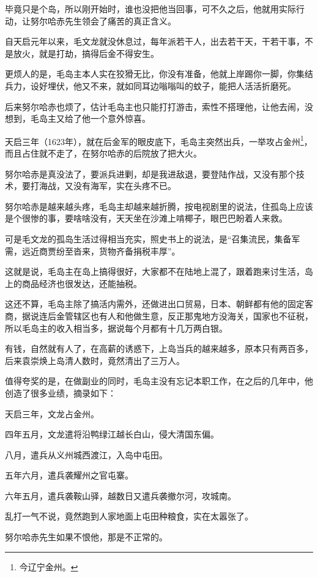 \begin{multicols}{\theparacolNo}
		毕竟只是个岛，所以刚开始时，谁也没把他当回事，可不久之后，他就用实际行动，让努尔哈赤先生领会了痛苦的真正含义。

		自天启元年以来，毛文龙就没休息过，每年派若干人，出去若干天，干若干事，不是放火，就是打劫，搞得后金不得安生。

		更烦人的是，毛岛主本人实在狡猾无比，你没有准备，他就上岸踢你一脚，你集结兵力，设好埋伏，他又不来，就如同耳边嗡嗡叫的蚊子，能把人活活折磨死。

		后来努尔哈赤也烦了，估计毛岛主也只能打打游击，索性不搭理他，让他去闹，没想到，毛岛主又给了他一个意外惊喜。

		天启三年（1623年），就在后金军的眼皮底下，毛岛主突然出兵，一举攻占金州\footnote{今辽宁金州。}，而且占住就不走了，在努尔哈赤的后院放了把大火。

		努尔哈赤是真没法了，要派兵进剿，却是我进敌退，要登陆作战，又没有那个技术，要打海战，又没有海军，实在头疼不已。

		努尔哈赤是越来越头疼，毛岛主却越来越折腾，按电视剧里的说法，住孤岛上应该是个很惨的事，要啥啥没有，天天坐在沙滩上啃椰子，眼巴巴盼着人来救。

		可是毛文龙的孤岛生活过得相当充实，照史书上的说法，是“召集流民，集备军需，远近商贾纷至沓来，货物齐备捐税丰厚”。

		这就是说，毛岛主在岛上搞得很好，大家都不在陆地上混了，跟着跑来讨生活，岛上的商品经济也很发达，还能抽税。

		这还不算，毛岛主除了搞活内需外，还做进出口贸易，日本、朝鲜都有他的固定客商，据说连后金管辖区也有人和他做生意，反正那鬼地方没海关，国家也不征税，所以毛岛主的收入相当多，据说每个月都有十几万两白银。

		有钱，自然就有人了，在高薪的诱惑下，上岛当兵的越来越多，原本只有两百多，后来袁崇焕上岛清人数时，竟然清出了三万人。

		值得夸奖的是，在做副业的同时，毛岛主没有忘记本职工作，在之后的几年中，他创造了很多业绩，摘录如下：

		天启三年，文龙占金州。

		四年五月，文龙遣将沿鸭绿江越长白山，侵大清国东偏。

		八月，遣兵从义州城西渡江，入岛中屯田。

		五年六月，遣兵袭耀州之官屯寨。

		六年五月，遣兵袭鞍山驿，越数日又遣兵袭撤尔河，攻城南。

		乱打一气不说，竟然跑到人家地面上屯田种粮食，实在太嚣张了。

		努尔哈赤先生如果不恨他，那是不正常的。


\end{multicols}
